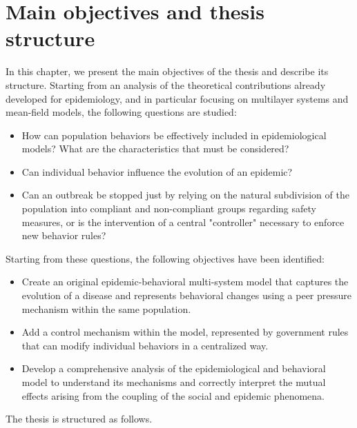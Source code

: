 
\chapter{Main objectives and thesis structure}

In this chapter, we present the main objectives of the thesis and describe its structure. Starting from an analysis of the theoretical contributions already developed for epidemiology, and in particular focusing on multilayer systems and mean-field models, the following questions are studied:

\begin{itemize}
	\item How can population behaviors be effectively included in epidemiological models? What are the characteristics that must be considered?
	\item Can individual behavior influence the evolution of an epidemic?
	\item Can an outbreak be stopped just  by relying on the natural subdivision of the population into compliant and non-compliant groups regarding safety measures, or is the intervention of a central "controller" necessary to enforce new behavior rules?
\end{itemize}



Starting from these questions, the following objectives have been identified:
\begin{itemize}
	\item Create an original epidemic-behavioral multi-system model that captures the evolution of a disease and represents behavioral changes using a peer pressure mechanism within the same population.
	\item Add a control mechanism within the model, represented by government rules that can modify individual behaviors in a centralized way.
	\item Develop a comprehensive analysis of the epidemiological and behavioral model to understand its mechanisms and correctly interpret the mutual effects arising from the coupling of the social and epidemic phenomena.
\end{itemize}
The thesis is structured as follows.



